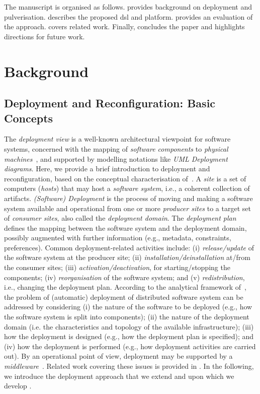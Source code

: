 \documentclass[conference]{IEEEtran}
\begin{document}
The manuscript is organised as follows.
%
 provides background on deployment and pulverisation.
%
 describes the proposed \ac{dsl} and platform.
%
 provides an evaluation of the approach.
%
 covers related work.
%
Finally,  concludes the paper and highlights directions for future work.

\section{Background}\label{sec:background}

\subsection{Deployment and Reconfiguration: Basic Concepts}\label{sec:background:dep}

The \emph{deployment view} is a well-known architectural viewpoint for software systems,
concerned with the mapping of \emph{software components} to \emph{physical machines}~\cite{DBLP:journals/software/Kruchten95}, 
 and supported by modelling notations like \emph{UML Deployment diagrams}.
%
Here, we provide a brief introduction to deployment and reconfiguration, based on the conceptual characterisation of~\cite{DBLP:journals/jss/ArcangeliBL15,carzaniga1998characterization}.
%
A \emph{site} is a set of computers (\emph{hosts}) that may host a \emph{software system}, i.e., a coherent collection of artifacts.
%
\emph{(Software) Deployment} is the process of moving and making a software system available and operational from one or more \emph{producer sites} to a target set of \emph{consumer sites}, also called the \emph{deployment domain}.
%
The \emph{deployment plan} defines 
 the mapping between the software system
 and the deployment domain,
 possibly augmented with further information (e.g., metadata, constraints, preferences).
%
Common deployment-related activities 
 include: (i) \emph{release/update} of the software system at the producer site;
 (ii) \emph{installation/deinstallation} at/from the consumer sites;
 (iii) \emph{activation/deactivation}, for starting/stopping the components;
 (iv) \emph{reorganisation} of the software system;
 and (v) \emph{redistribution}, i.e., changing the deployment plan.
%
According to the analytical framework of~\cite{DBLP:journals/jss/ArcangeliBL15},
  the problem of (automatic) deployment of distributed software system can be addressed by considering
 (i) the nature of the software to be deployed (e.g., how the software system is split into components);
 (ii) the nature of the deployment domain (i.e. the characteristics and topology of the available infrastructure);
 (iii) how the deployment is designed (e.g., how the deployment plan is specified);
 and 
 (iv) how the deployment is performed (e.g., how deployment activities are carried out).
%
By an operational point of view, 
 deployment may be supported by a \emph{middleware}~\cite{DBLP:journals/cacm/GazisK22}.
%
Related work covering these issues is provided in .
%
In the following, we introduce the deployment approach 
  that we extend and upon which we develop \ourframework{}.
\end{document}
